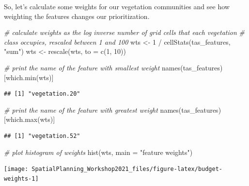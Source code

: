 \documentclass[
  12pt,
]{book}
\newenvironment{Shaded}{\begin{snugshade}}{\end{snugshade}}
\newcommand{\AttributeTok}[1]{\textcolor[rgb]{0.77,0.63,0.00}{#1}}
\newcommand{\CommentTok}[1]{\textcolor[rgb]{0.56,0.35,0.01}{\textit{#1}}}
\newcommand{\DecValTok}[1]{\textcolor[rgb]{0.00,0.00,0.81}{#1}}
\newcommand{\FunctionTok}[1]{\textcolor[rgb]{0.00,0.00,0.00}{#1}}
\newcommand{\NormalTok}[1]{#1}
\newcommand{\OtherTok}[1]{\textcolor[rgb]{0.56,0.35,0.01}{#1}}
\newcommand{\SpecialCharTok}[1]{\textcolor[rgb]{0.00,0.00,0.00}{#1}}
\newcommand{\StringTok}[1]{\textcolor[rgb]{0.31,0.60,0.02}{#1}}
\begin{document}
So, let's calculate some weights for our vegetation communities and see how weighting the features changes our prioritization.

\begin{Shaded}
\begin{Highlighting}[]
\CommentTok{\# calculate weights as the log inverse number of grid cells that each vegetation}
\CommentTok{\# class occupies, rescaled between 1 and 100}
\NormalTok{wts }\OtherTok{\textless{}{-}} \DecValTok{1} \SpecialCharTok{/} \FunctionTok{cellStats}\NormalTok{(tas\_features, }\StringTok{"sum"}\NormalTok{)}
\NormalTok{wts }\OtherTok{\textless{}{-}} \FunctionTok{rescale}\NormalTok{(wts, }\AttributeTok{to =} \FunctionTok{c}\NormalTok{(}\DecValTok{1}\NormalTok{, }\DecValTok{10}\NormalTok{))}

\CommentTok{\# print the name of the feature with smallest weight}
\FunctionTok{names}\NormalTok{(tas\_features)[}\FunctionTok{which.min}\NormalTok{(wts)]}
\end{Highlighting}
\end{Shaded}

\begin{verbatim}
## [1] "vegetation.20"
\end{verbatim}

\begin{Shaded}
\begin{Highlighting}[]
\CommentTok{\# print the name of the feature with greatest weight}
\FunctionTok{names}\NormalTok{(tas\_features)[}\FunctionTok{which.max}\NormalTok{(wts)]}
\end{Highlighting}
\end{Shaded}

\begin{verbatim}
## [1] "vegetation.52"
\end{verbatim}

\begin{Shaded}
\begin{Highlighting}[]
\CommentTok{\# plot histogram of weights}
\FunctionTok{hist}\NormalTok{(wts, }\AttributeTok{main =} \StringTok{"feature weights"}\NormalTok{)}
\end{Highlighting}
\end{Shaded}

\begin{center}\texttt{[image: SpatialPlanning\_Workshop2021\_files/figure-latex/budget-weights-1]} \end{center}
\end{document}
